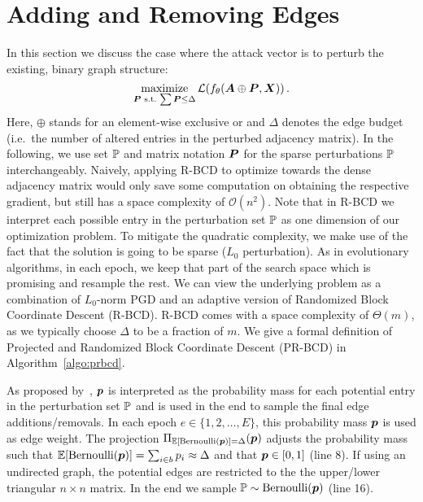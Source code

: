 \documentclass[letterpaper]{article} %
\newcommand{\adj}{\mA}
\newcommand{\features}{\mX}
\DeclareMathOperator*{\maximize}{maximize}
\begin{document}
\section{Adding and Removing Edges}\label{sec:prbcd}

In this section we discuss the case where the attack vector is to perturb the existing, binary graph structure:
%
\begin{equation}\label{eq:pgd}
    \maximize_{\mP\,\,\text{s.t.}\, \sum \mP \le \Delta} \mathcal{L}(f_{\theta}(\adj \oplus \mP, \features))\,.
\end{equation}
%
Here, \(\oplus\) stands for an element-wise exclusive or and \(\Delta\) denotes the edge budget (i.e.\ the number of altered entries in the perturbed adjacency matrix). In the following, we use set \({\mathbb{P}}\) and matrix notation \({\bm{P}}\) for the sparse perturbations \({\mathbb{P}}\) interchangeably. Naively, applying R-BCD to optimize towards the dense adjacency matrix would only save some computation on obtaining the respective gradient, but still has a space complexity of \(\mathcal{O}(n^2)\). Note that in R-BCD we interpret each possible entry in the perturbation set \({\mathbb{P}}\) as one dimension of our optimization problem. To mitigate the quadratic complexity, we make use of the fact that the solution is going to be sparse (\(L_0\) perturbation). As in evolutionary algorithms, in each epoch, we keep that part of the search space which is promising and resample the rest. We can view the underlying problem as a combination of \(L_0\)-norm PGD and an adaptive version of Randomized Block Coordinate Descent (R-BCD). R-BCD comes with a space complexity of \(\Theta(m)\), as we typically choose \(\Delta\) to be a fraction of \(m\). We give a formal definition of Projected and Randomized Block Coordinate Descent (PR-BCD) in Algorithm~\ref{algo:prbcd}.

As proposed by~\citet{Xu2019a}, \({\bm{p}}\) is interpreted as the probability mass for each potential entry in the perturbation set \({\mathbb{P}}\) and is used in the end to sample the final edge additions/removals. In each epoch \(e \in \{1,2, \dots, E\}\), this probability mass \({\bm{p}}\) is used as edge weight. The projection \(\Pi_{\mathbb{E}[\text{Bernoulli}({\bm{p}})] = \Delta} ({\bm{p}})\) adjusts the probability mass such that \(\mathbb{E}[\text{Bernoulli}({\bm{p}})] = \sum_{i \in b} {p}_i \approx \Delta\) and that \({\bm{p}} \in [0, 1]\) (line 8). If using an undirected graph, the potential edges are restricted to the the upper/lower triangular \(n \times n\) matrix. In the end we sample \({\mathbb{P}} \sim \text{Bernoulli}({\bm{p}})\) (line 16).
\end{document}
